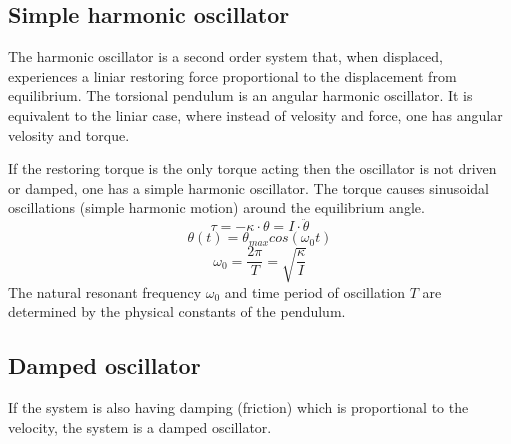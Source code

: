\documentclass[\main/master.tex]{subfiles}
\begin{document}
\subsection{Simple harmonic oscillator}
The harmonic oscillator is a second order system that, when displaced, experiences a liniar restoring force proportional to the displacement from equilibrium. The torsional pendulum is an angular harmonic oscillator. It is equivalent to the liniar case, where instead of velosity and force, one has angular velosity and torque.
\par\noindent
If the restoring torque is the only torque acting then the oscillator is not driven or damped, one has a simple harmonic oscillator. The torque causes sinusoidal oscillations (simple harmonic motion) around the equilibrium angle.  
\begin{equation}
\tau = -\kappa\cdot\theta  = I\cdot\ddot{\theta}   \label{eqn:undamped_motion_equation}
\end{equation}
\begin{equation}
\theta(t) = \theta_{max}cos(\omega_0 t )    \label{eqn:undamped_motion_equation}
\end{equation}
\begin{equation}
\omega_0  = \frac{2\pi}{T} = \sqrt{\frac{\kappa}{I}}   \label{eqn:undamped_motion_equation}
\end{equation}
The natural resonant frequency $\omega_0$ and time period of oscillation $T$ are determined by the physical constants of the pendulum.


\subsection{Damped oscillator}
If the system is also having damping (friction) which is proportional to the velocity, the system is a damped oscillator.
\end{document}

